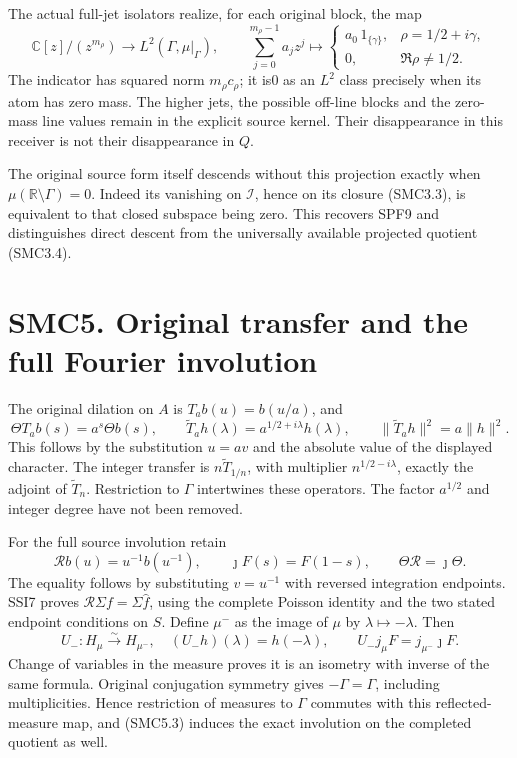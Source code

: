 The actual full-jet isolators realize, for each original block, the map
\[
\mathbb C[z]/(z^{m_\rho})\longrightarrow L^2(\Gamma,\mu|_\Gamma),
\qquad \sum_{j=0}^{m_\rho-1}a_jz^j\longmapsto
\begin{cases}
a_0\,1_{\{\gamma\}},&\rho=1/2+i\gamma,\\
0,&\Re\rho\ne1/2.
\end{cases}
\tag{SMC4.4}
\] The indicator has squared norm \(m_\rho c_\rho\); it is0 as an
\(L^2\) class precisely when its atom has zero mass. The higher jets,
the possible off-line blocks and the zero-mass line values remain in the
explicit source kernel. Their disappearance in this receiver is not
their disappearance in \(Q\).

The original source form itself descends without this projection exactly
when \(\mu(\mathbb R\setminus\Gamma)=0\). Indeed its vanishing on
\(\mathcal I\), hence on its closure (SMC3.3), is equivalent to that
closed subspace being zero. This recovers SPF9 and distinguishes direct
descent from the universally available projected quotient (SMC3.4).

\section{SMC5. Original transfer and the full Fourier
involution}\label{smc5.-original-transfer-and-the-full-fourier-involution}

The original dilation on \(A\) is \(T_a b(u)=b(u/a)\), and \[
\Theta T_a b(s)=a^s\Theta b(s),\qquad
\widetilde T_a h(\lambda)=a^{1/2+i\lambda}h(\lambda),
\qquad\|\widetilde T_a h\|^2=a\|h\|^2.
\tag{SMC5.1}
\] This follows by the substitution \(u=av\) and the absolute value of
the displayed character. The integer transfer is
\(n\widetilde T_{1/n}\), with multiplier \(n^{1/2-i\lambda}\), exactly
the adjoint of \(\widetilde T_n\). Restriction to \(\Gamma\) intertwines
these operators. The factor \(a^{1/2}\) and integer degree have not been
removed.

For the full source involution retain \[
\mathcal R b(u)=u^{-1}b(u^{-1}),\qquad
\jmath F(s)=F(1-s),\qquad\Theta\mathcal R=\jmath\Theta.
\tag{SMC5.2}
\] The equality follows by substituting \(v=u^{-1}\) with reversed
integration endpoints. SSI7 proves
\(\mathcal R\Sigma f=\Sigma\widehat f\), using the complete Poisson
identity and the two stated endpoint conditions on \(S\). Define
\(\mu^-\) as the image of \(\mu\) by \(\lambda\mapsto-\lambda\). Then \[
U_-:H_\mu\xrightarrow{\sim}H_{\mu^-},\quad
(U_-h)(\lambda)=h(-\lambda),\qquad
U_-j_\mu F=j_{\mu^-}\jmath F.
\tag{SMC5.3}
\] Change of variables in the measure proves it is an isometry with
inverse of the same formula. Original conjugation symmetry gives
\(-\Gamma=\Gamma\), including multiplicities. Hence restriction of
measures to \(\Gamma\) commutes with this reflected-measure map, and
(SMC5.3) induces the exact involution on the completed quotient as well.

